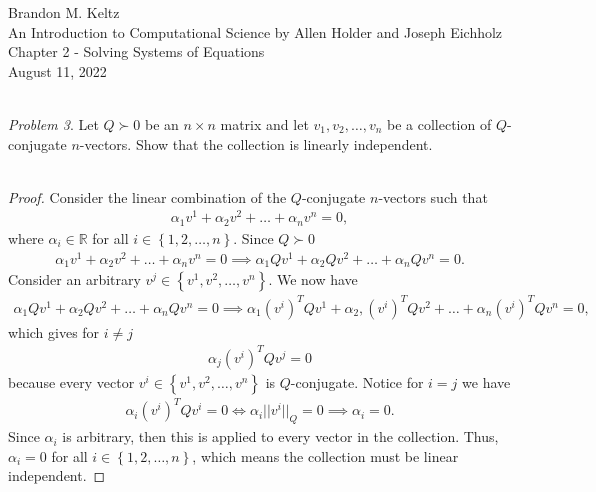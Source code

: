 \documentclass{article}
\begin{document}
	\begin{flushleft}

		Brandon M. Keltz\\
		An Introduction to Computational Science by Allen Holder and Joseph Eichholz\\
		Chapter 2 - Solving Systems of Equations\\
		August 11, 2022\\\

		\textit{Problem 3}. Let $Q \succ 0$ be an $n \times n$ matrix and let $v_1, v_2, \ldots, v_n$ be a collection of $Q$-conjugate $n$-vectors. Show that the collection is linearly independent. \\\

		\begin{proof}

			Consider the linear combination of the $Q$-conjugate $n$-vectors such that
			\begin{align*}
				\alpha_1 v^1 + \alpha_2 v^2 + \ldots + \alpha_n v^n = 0,
			\end{align*}
			where $\alpha_i \in \mathbb{R}$ for all $i \in \left\{ 1, 2, \ldots, n \right\}$. Since $Q \succ 0$
			\begin{align*}
				\alpha_1 v^1 + \alpha_2 v^2 + \ldots + \alpha_n v^n = 0 \implies \alpha_1 Q v^1 + \alpha_2 Q v^2 + \ldots + \alpha_n Q v^n = 0.
			\end{align*}
			Consider an arbitrary $v^j \in \left\{ v^1, v^2, \ldots, v^n \right\}$. We now have
			\begin{align*}
				\alpha_1 Q v^1 + \alpha_2 Q v^2 + \ldots + \alpha_n Q v^n = 0 \implies \alpha_1 \left( v^i \right)^T Q v^1 + \alpha_2, \left( v^i \right)^T Q v^2 + \ldots + \alpha_n \left( v^i \right)^T Q v^n = 0,
			\end{align*}
			which gives for $i \neq j$
			\begin{align*}
				\alpha_j \left( v^i \right)^T Q v^j = 0
			\end{align*}
			because every vector $v^i \in \left\{ v^1, v^2, \ldots, v^n \right\}$ is $Q$-conjugate. Notice for $i = j$ we have
			\begin{align*}
				\alpha_i \left( v^i \right)^T Q v^i = 0 \iff \alpha_i ||v^i||_Q = 0 \implies \alpha_i = 0.
			\end{align*}
			Since $\alpha_i$ is arbitrary, then this is applied to every vector in the collection. Thus, $\alpha_i = 0$ for all $i \in \left\{ 1, 2, \ldots, n \right\}$, which means the collection must be linear independent.

		\end{proof}

	\end{flushleft}
\end{document}
